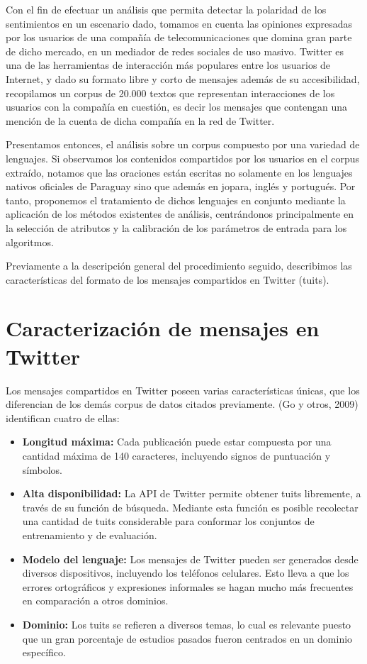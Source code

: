 Con el fin de efectuar un an\'alisis que permita detectar la polaridad de los sentimientos en un escenario dado, tomamos en cuenta las opiniones expresadas por los usuarios de una compa\~n\'ia de telecomunicaciones que domina gran parte de dicho mercado, en un mediador de redes sociales de uso masivo. Twitter es una de las herramientas de interacci\'on m\'as populares entre los usuarios de Internet, y dado su formato libre y corto de mensajes adem\'as de su accesibilidad, recopilamos un corpus de 20.000 textos que representan interacciones de los usuarios con la compa\~n\'ia en cuesti\'on, es decir los mensajes que contengan una menci\'on de la cuenta de dicha compa\~n\'ia en la red de Twitter.
\newline

Presentamos entonces, el an\'alisis sobre un corpus compuesto por una variedad de lenguajes. Si observamos los contenidos compartidos por los usuarios en el corpus extra\'ido, notamos que las oraciones est\'an escritas no solamente en los lenguajes nativos oficiales de Paraguay sino que adem\'as en jopara, ingl\'es y portugu\'es. Por tanto, proponemos el tratamiento de dichos lenguajes en conjunto mediante la aplicaci\'on de los m\'etodos existentes de an\'alisis, centr\'andonos principalmente en la selecci\'on de atributos y la calibraci\'on de los par\'ametros de entrada para los algoritmos.
\newline

Previamente a la descripci\'on general del procedimiento seguido, describimos las caracter\'isticas del formato de los mensajes compartidos en Twitter (tuits).

\section{Caracterizaci\'on de mensajes en Twitter}

Los mensajes compartidos en Twitter poseen varias caracter\'isticas \'unicas, que los diferencian de los dem\'as corpus de datos citados previamente. (Go y otros, 2009) identifican cuatro de ellas:

\begin{itemize}
\item \textbf{Longitud m\'axima:} Cada publicaci\'on puede estar compuesta por una cantidad m\'axima de 140 caracteres, incluyendo signos de puntuaci\'on y s\'imbolos.
\item \textbf{Alta disponibilidad:} La API de Twitter permite obtener tuits libremente, a trav\'es de su funci\'on de b\'usqueda. Mediante esta funci\'on es posible recolectar una cantidad de tuits considerable para conformar los conjuntos de entrenamiento y de evaluaci\'on.
\item \textbf{Modelo del lenguaje:} Los mensajes de Twitter pueden ser generados desde diversos dispositivos, incluyendo los tel\'efonos celulares. Esto lleva a que los errores ortogr\'aficos y expresiones informales se hagan mucho m\'as frecuentes en comparaci\'on a otros dominios.
\item \textbf{Dominio:} Los tuits se refieren a diversos temas, lo cual es relevante puesto que un gran porcentaje de estudios pasados fueron centrados en un dominio espec\'ifico.
\end{itemize}


